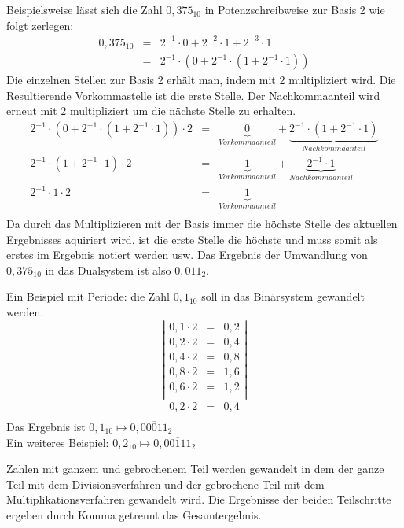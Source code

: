 \documentclass[11pt,a4paper]{scrreprt}
\begin{document}
Beispielsweise lässt sich die Zahl $0,375_{10}$ in Potenzschreibweise zur Basis 2 wie folgt zerlegen:
\begin{eqnarray*}
0,375_{10} & = & 2^{-1} \cdot 0 + 2^{-2} \cdot 1 + 2^{-3} \cdot 1 \\
& = & 2^{-1} \cdot (0 + 2^{-1} \cdot (1 + 2^{-1} \cdot 1))
\end{eqnarray*}
Die einzelnen Stellen zur Basis 2 erhält man, indem mit 2 multipliziert wird. Die Resultierende Vorkommastelle ist die erste Stelle. Der Nachkommaanteil wird erneut mit 2 multipliziert um die nächste Stelle zu erhalten.
$$
\begin{array}{rrl}
	2^{-1} \cdot (0 + 2^{-1} \cdot (1 + 2^{-1} \cdot 1)) \cdot 2 
	& = & 
	\underbrace{0}_{Vorkommaanteil} + \underbrace{2^{-1} \cdot (1 + 2^{-1} \cdot 1)}_{Nachkommaanteil} \\
	
	2^{-1} \cdot (1 + 2^{-1} \cdot 1) \cdot 2 
	& = & 
	\underbrace{1}_{Vorkommaanteil} 
	+ \underbrace{ 2^{-1} \cdot 1 }_{Nachkommaanteil}\\
	
	2^{-1} \cdot 1
	\cdot 2 & = & 
	\underbrace{1}_{Vorkommaanteil} \\
\end{array}
$$
Da durch das Multiplizieren mit der Basis immer die höchste Stelle des aktuellen Ergebnisses aquiriert wird, ist die erste Stelle die höchste und muss somit als erstes im Ergebnis notiert werden usw. Das Ergebnis der Umwandlung von $0,375_{10}$ in das Dualsystem ist also $0,011_2$.

Ein Beispiel mit Periode: die Zahl $0,1_{10}$ soll in das Binärsystem gewandelt werden.
$$
\left|
\begin{array} {rrl}
	0,1 \cdot 2 &=& 0,2 \\
	0,2 \cdot 2 &=& 0,4 \\
	0,4 \cdot 2 &=& 0,8 \\
	0,8 \cdot 2 &=& 1,6 \\
	0,6 \cdot 2 &=& 1,2 \\
\end{array}
\right|
$$
$$
\begin{array} {rrl}
	0,2 \cdot 2 &=& 0,4 \\
\end{array}
$$
Das Ergebnis ist $0,1_{10} \mapsto 0,\overline{00011}_2$ \\
Ein weiteres Beispiel: $0,2_{10} \mapsto 0,\overline{00111}_2$

Zahlen mit ganzem und gebrochenem Teil werden gewandelt in dem der ganze Teil mit dem Divisionsverfahren und der gebrochene Teil mit dem Multiplikationsverfahren gewandelt wird. Die Ergebnisse der beiden Teilschritte ergeben durch Komma getrennt das Gesamtergebnis.
\end{document}
